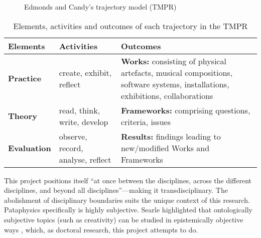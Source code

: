 \begin{figure}[!htbp] %
  \centering
  \caption[Edmonds and Candy's trajectory model]{Edmonds and Candy's trajectory model (TMPR)}
\label{fig:tmpr}
\end{figure}

\begin{table}[!htbp]
\caption[Elements, activities and outcomes of the TMPR]{Elements, activities and outcomes of each trajectory in the TMPR}
\label{tab:tmpr}
  \begin{tabu}{X[1]X[2]X[3]}
  \toprule
  \textbf{Elements}
  &
  \textbf{Activities}
  &
  \textbf{Outcomes}
  \\ \midrule
  \textbf{Practice}
  &
  create, exhibit, reflect
  &
  \textbf{Works:} consisting of physical artefacts, musical compositions, software systems, installations, exhibitions, collaborations
  \\ \midrule
  \textbf{Theory}
  &
  read, think, write, develop
  &
  \textbf{Frameworks:} comprising questions, criteria, issues
  \\ \midrule
  \textbf{Evaluation}
  &
  observe, record, analyse, reflect
  &
  \textbf{Results:} findings leading to new/modified Works and Frameworks
  \\ \bottomrule
  \end{tabu}
\end{table}

\spirals

This project positions itself ``at once between the disciplines, across the different disciplines, and beyond all disciplines''---making it transdisciplinary. The abolishment of disciplinary boundaries suits the unique context of this research. Pataphysics specifically is highly subjective. Searle highlighted that ontologically subjective topics (such as creativity) can be studied in epistemically objective ways \autocite*{Searle2015}, which, as doctoral research, this project attempts to do.


